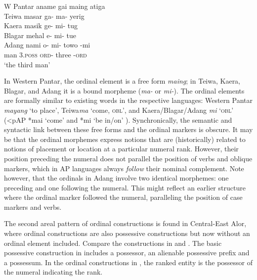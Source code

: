 \ea
\label{bkm:Ref342649632}
\gllllll
      {W Pantar}     aname  gai  maing  atiga \\  
      Teiwa          masar  ga-  ma-  yerig \\
      Kaera          masik  ge-  mi-  tug \\
      Blagar         mehal {\textglotstop}e-  mi-  tue  \\
      Adang          nami  o-  mi-  towo  {}-mi \\      
      { }            man \textsc{3.poss}  \textsc{ord-} three  -\textsc{ord} \\
\glt  `the third man'
\z


In Western Pantar, the ordinal element is a free form \textit{maing}; in Teiwa, Kaera, Blagar, and Adang it is a bound morpheme (\textit{ma-} or \textit{mi-}). The ordinal elements are formally similar to existing words in the respective languages: Western Pantar \textit{mayang} `to place', Teiwa\textit{ma} `come, \textsc{obl}', and Kaera/Blagar/Adang \textit{mi} `\textsc{obl' (}{\textless}pAP *mai `come' and *mi `be in/on' \citealt{HoltonRobinsonTV}). Synchronically, the semantic and syntactic link between these free forms and the ordinal markers is obscure. It may be that the ordinal morphemes express notions that are (historically) related to notions of placement or location at a particular numeral rank. However, their position preceding the numeral does not parallel the position of verbs and oblique markers, which in AP languages always \textit{follow} their nominal complement. Note however, that the ordinals in Adang involve two identical morphemes: one preceding and one following the numeral. This might reflect an earlier structure where the ordinal marker followed the numeral, paralleling the position of case markers and verbs.

The second areal pattern of ordinal constructions is found in Central-East Alor, where ordinal constructions are also possessive constructions but now without an ordinal element included. Compare the constructions in  and . The basic possessive construction in  includes a possessor, an alienable possessive prefix and a possessum. In the ordinal constructions in , the ranked entity is the possessor of the numeral indicating the rank.

